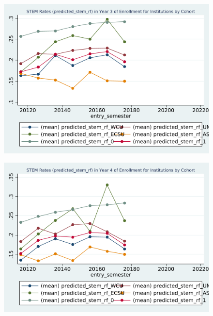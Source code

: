 \newpage
\begin{figure}[h!]
\begin{centering}
\includegraphics[scale=1]{"figures/predicted_stem_rf_by_entry_3_INSTITUTION_STEM"}
\end{centering}
\end{figure}
\newpage
\begin{figure}[h!]
\begin{centering}
\includegraphics[scale=1]{"figures/predicted_stem_rf_by_entry_4_INSTITUTION_STEM"}
\end{centering}
\end{figure}
\newpage
